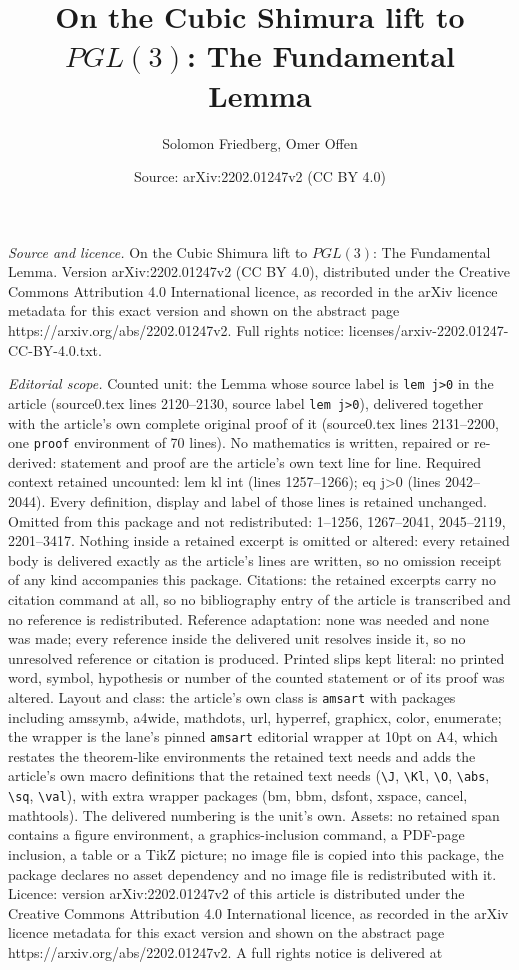 \documentclass[10pt,a4paper]{amsart}
\title[On the Cubic Shimura lift to $PGL(3)$: The Fundamental Lemma]{On the Cubic Shimura lift to $PGL(3)$: The Fundamental Lemma}
\author{Solomon Friedberg, Omer Offen}
\date{Source: arXiv:2202.01247v2 (CC BY 4.0)}
\begin{document}
\maketitle

\noindent\emph{Source and licence.} On the Cubic Shimura lift to $PGL(3)$: The Fundamental Lemma. Version arXiv:2202.01247v2 (CC BY 4.0), distributed under the Creative Commons Attribution 4.0 International licence, as recorded in the arXiv licence metadata for this exact version and shown on the abstract page https://arxiv.org/abs/2202.01247v2. Full rights notice: licenses/arxiv-2202.01247-CC-BY-4.0.txt.\par\smallskip

\noindent\textit{Editorial scope.} Counted unit: the Lemma whose source label is \texttt{lem j>0} in the article (source0.tex lines 2120--2130, source label \texttt{lem j>0}), delivered together with the article's own complete original proof of it (source0.tex lines 2131--2200, one \texttt{proof} environment of 70 lines). No mathematics is written, repaired or re-derived: statement and proof are the article's own text line for line. Required context retained uncounted: lem kl int (lines 1257--1266); eq j>0 (lines 2042--2044). Every definition, display and label of those lines is retained unchanged. Omitted from this package and not redistributed: 1--1256, 1267--2041, 2045--2119, 2201--3417. Nothing inside a retained excerpt is omitted or altered: every retained body is delivered exactly as the article's lines are written, so no omission receipt of any kind accompanies this package. Citations: the retained excerpts carry no citation command at all, so no bibliography entry of the article is transcribed and no reference is redistributed. Reference adaptation: none was needed and none was made; every reference inside the delivered unit resolves inside it, so no unresolved reference or citation is produced. Printed slips kept literal: no printed word, symbol, hypothesis or number of the counted statement or of its proof was altered. Layout and class: the article's own class is \texttt{amsart} with packages including amssymb, a4wide, mathdots, url, hyperref, graphicx, color, enumerate; the wrapper is the lane's pinned \texttt{amsart} editorial wrapper at 10pt on A4, which restates the theorem-like environments the retained text needs and adds the article's own macro definitions that the retained text needs (\texttt{\textbackslash J}, \texttt{\textbackslash Kl}, \texttt{\textbackslash O}, \texttt{\textbackslash abs}, \texttt{\textbackslash sq}, \texttt{\textbackslash val}), with extra wrapper packages (bm, bbm, dsfont, xspace, cancel, mathtools). The delivered numbering is the unit's own. Assets: no retained span contains a figure environment, a graphics-inclusion command, a PDF-page inclusion, a table or a TikZ picture; no image file is copied into this package, the package declares no asset dependency and no image file is redistributed with it. Licence: version arXiv:2202.01247v2 of this article is distributed under the Creative Commons Attribution 4.0 International licence, as recorded in the arXiv licence metadata for this exact version and shown on the abstract page https://arxiv.org/abs/2202.01247v2. A full rights notice is delivered at 
\end{document}
